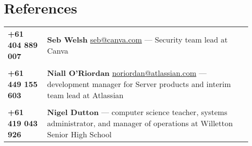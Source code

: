 \documentclass[a4paper,12pt]{article}
\begin{document}
\section*{References}

\begin{tabular}{p{35mm}p{125mm}}
	                    \textbf{+61 404 889 007}    & \textbf{Seb Welsh} \textlangle{}\href{mailto:seb@canva.com}{seb@canva.com}\textrangle{} --- Security team lead at Canva
	\\              \\  \textbf{+61 449 155 603}    & \textbf{Niall O’Riordan} \textlangle{}\href{mailto:noriordan@atlassian.com}{noriordan@atlassian.com}\textrangle{} --- development manager for Server products and interim team lead at Atlassian
	\\              \\  \textbf{+61 419 043 926}    & \textbf{Nigel Dutton} --- computer science teacher, systems administrator, and manager of operations at Willetton Senior High School
\end{tabular}
\end{document}
